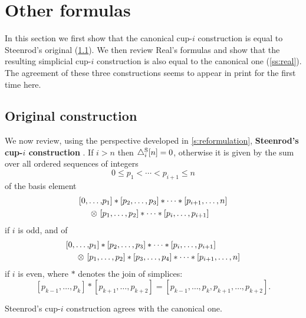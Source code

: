 
\section{Other formulas}\label{s:others}

In this section we first show that the canonical \mbox{cup-$i$} construction is equal to Steenrod's original (\cref{ss:original}).
We then review Real's formulas and show that the resulting simplicial \mbox{cup-$i$} construction is also equal to the canonical one (\cref{ss:real}).
The agreement of these three constructions seems to appear in print for the first time here.

\subsection{Original construction}\label{ss:original}

We now review, using the perspective developed in \cref{s:reformulation}, \textbf{Steenrod's \mbox{cup-$i$} construction} \cite[p.293]{steenrod1947products}.
If $i > n$ then $\triangle_i^{\mathrm{S}} [n] = 0$, otherwise it is given by the sum over all ordered sequences of integers
\[
0 \leq p_1 < \cdots < p_{i+1} \leq n
\]
of the basis element
\begin{equation}\label{e:original i odd}
\begin{split}
[ 0, \dots, &{p_1} ] \ast [ {p_2}, \dots, {p_3} ] \ast \cdots \ast [ {p_{i+1}}, \dots, n ] \\
\otimes \ [ &{p_1}, \dots, {p_2} ] \ast \cdots \ast [ {p_{i}}, \dots, {p_{i+1}} ]
\end{split}
\end{equation}
if $i$ is odd, and of
\begin{equation}\label{e:original i even}
\begin{split}
[ 0, \dots, &{p_1} ] \ast [ {p_2}, \dots, {p_3} ] \ast \cdots \ast [ {p_{i}}, \dots, {p_{i+1}} ] \\
\otimes \ [ &{p_1}, \dots, {p_2} ] \ast [ {p_3}, \dots, {p_4} ] \ast \cdots \ast [ {p_{i+1}}, \dots, n ]
\end{split}
\end{equation}
if $i$ is even, where $\ast$ denotes the join of simplices:
\[
[{p_{k-1}}, \dots, {p_{k}} ] \ast [ {p_{k+1}}, \dots, p_{k+2}] = [{p_{k-1}}, \dots, p_k, p_{k+1}, \dots, p_{k+2}].
\]

\begin{theorem}\label{t:steenrod cup-i}
	Steenrod's \mbox{cup-$i$} construction agrees with the canonical one.
\end{theorem}

